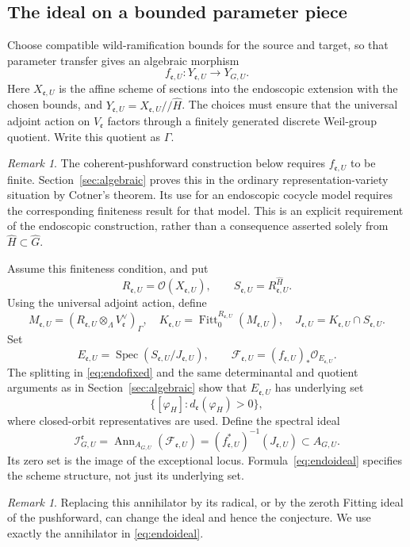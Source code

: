 \documentclass[11pt,a4paper]{amsart}
\DeclareMathOperator{\Spec}{Spec}
\DeclareMathOperator{\Fitt}{Fitt}
\DeclareMathOperator{\Ann}{Ann}
\newcommand{\OO}{\mathcal O}
\newcommand{\mcI}{\mathcal I}
\theoremstyle{definition}
\theoremstyle{remark}
\newtheorem{remark}[theorem]{Remark}
\begin{document}
\subsection{The ideal on a bounded parameter piece}
Choose compatible wild-ramification bounds for the source and target, so that parameter transfer gives an algebraic morphism
$$
f_{\mathfrak e,U}:Y_{\mathfrak e,U}\longrightarrow Y_{G,U}.
$$
Here $X_{\mathfrak e,U}$ is the affine scheme of sections into the endoscopic extension with the chosen bounds, and $Y_{\mathfrak e,U}=X_{\mathfrak e,U}//\widehat H$. The choices must ensure that the universal adjoint action on $V_{\mathfrak e}$ factors through a finitely generated discrete Weil-group quotient. Write this quotient as $\Gamma$.
\begin{remark}\label{rem:finite}
The coherent-pushforward construction below requires $f_{\mathfrak e,U}$ to be finite. Section~\ref{sec:algebraic} proves this in the ordinary representation-variety situation by Cotner's theorem. Its use for an endoscopic cocycle model requires the corresponding finiteness result for that model. This is an explicit requirement of the endoscopic construction, rather than a consequence asserted solely from $\widehat H\subset\widehat G$.
\end{remark}
Assume this finiteness condition, and put
$$
R_{\mathfrak e,U}=\OO(X_{\mathfrak e,U}),\qquad
S_{\mathfrak e,U}=R_{\mathfrak e,U}^{\widehat H}.
$$
Using the universal adjoint action, define
$$
M_{\mathfrak e,U}
=(R_{\mathfrak e,U}\otimes_\Lambda V_{\mathfrak e}^\vee)_\Gamma,
\quad
K_{\mathfrak e,U}=\Fitt_0^{R_{\mathfrak e,U}}(M_{\mathfrak e,U}),
\quad
J_{\mathfrak e,U}=K_{\mathfrak e,U}\cap S_{\mathfrak e,U}.
$$
Set
$$
E_{\mathfrak e,U}=\Spec(S_{\mathfrak e,U}/J_{\mathfrak e,U}),
\qquad
\mathcal F_{\mathfrak e,U}=(f_{\mathfrak e,U})_*\OO_{E_{\mathfrak e,U}}.
$$
The splitting in \eqref{eq:endofixed} and the same determinantal and quotient arguments as in Section~\ref{sec:algebraic} show that $E_{\mathfrak e,U}$ has underlying set
$$
\{[\varphi_H]:d_{\mathfrak e}(\varphi_H)>0\},
$$
where closed-orbit representatives are used. Define the spectral ideal
\begin{equation}\label{eq:endoideal}
{\mcI_{G,U}^{\mathfrak e}
=\Ann_{A_{G,U}}(\mathcal F_{\mathfrak e,U})
=(f_{\mathfrak e,U}^*)^{-1}(J_{\mathfrak e,U})\subset A_{G,U}.}
\end{equation}
Its zero set is the image of the exceptional locus. Formula~\eqref{eq:endoideal} specifies the scheme structure, not just its underlying set.
\begin{remark}
Replacing this annihilator by its radical, or by the zeroth Fitting ideal of the pushforward, can change the ideal and hence the conjecture. We use exactly the annihilator in \eqref{eq:endoideal}.
\end{remark}
\end{document}

